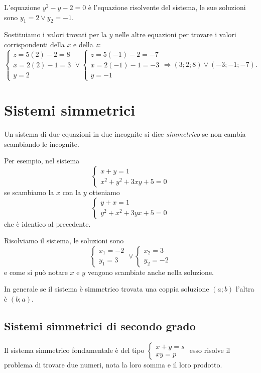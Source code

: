 \begin{exrig}
\begin{esempio}
L'equazione $y^2-y-2=0$ è l'equazione risolvente del sistema, le sue soluzioni sono $y_1=2\vee y_2=-1$.

Sostituiamo i valori trovati per la $ y $ nelle altre equazioni per trovare i valori corrispondenti della $ x $ e della $ z $: \[ \left\{\begin{array}{l}z=5(2)-2=8 \\x=2(2)-1=3 \\y=2 \end{array}\right.\vee \left\{\begin{array}{l}z=5(-1)-2=-7 \\x=2(-1)-1=-3 \\y=-1 \end{array}\right.\Rightarrow (3;2;8)\vee (-3;-1;-7). \]
\end{esempio}
\end{exrig}
\ovalbox{\risolvii \ref{ese:6.12}, \ref{ese:6.13}}

\section{Sistemi simmetrici}
Un sistema di due equazioni in due incognite si dice \emph{simmetrico} se non cambia scambiando le incognite.

Per esempio, nel sistema 
\[\left\{\begin{array}{l}{x+y=1}\\{x^2+y^2+3{xy}+5=0}\end{array}\right.\] se scambiamo la $x$ con la $y$ otteniamo 
\[\left\{\begin{array}{l}{y+x=1}\\{y^2+x^2+3{yx}+5=0}\end{array}\right.\] che è identico al precedente.

Risolviamo il sistema, le soluzioni sono 
\[\left\{\begin{array}{l}{x_1=-2}\\{y_1=3}\end{array}\right.\vee \left\{\begin{array}{l}{x_2=3}\\{y_2=-2}\end{array}\right.\] 
e come si può notare $x$ e $y$ vengono scambiate anche nella soluzione.

In generale se il sistema è simmetrico trovata una coppia soluzione $(a;b)$ l'altra è $(b;a)$.

\subsection{Sistemi simmetrici di secondo grado}
Il sistema simmetrico fondamentale è del tipo $\left\{\begin{array}{l}{x+y=s}\\{xy=p}\end{array}\right.$ esso risolve il problema di trovare due numeri, nota la loro somma e il loro prodotto.

